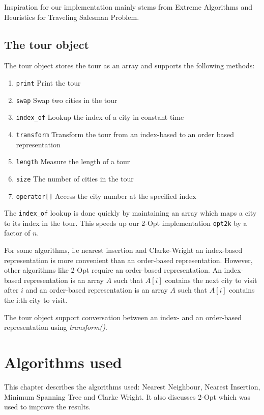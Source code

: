 \documentclass{report}
\begin{document}
Inspiration for our implementation mainly stems from Extreme Algorithms\cite{extreme} and Heuristics for Traveling Salesman Problem.\cite{Nilsson}

\section{The tour object}
The tour object stores the tour as an array and supports the following methods:
\begin{enumerate}
\item \verb!print! Print the tour
\item \verb!swap! Swap two cities in the tour
\item \verb!index_of! Lookup the index of a city in constant time
\item \verb!transform! Transform the tour from an index-based to an order based representation
\item \verb!length! Measure the length of a tour
\item \verb!size! The number of cities in the tour
\item \verb!operator[]! Access the city number at the specified index
\end{enumerate}

The \verb!index_of! lookup is done quickly by maintaining an array which maps a city to its index in the tour. This speeds up our 2-Opt implementation \verb!opt2k! by a factor of $n$.%

For some algorithms, i.e nearest insertion and Clarke-Wright an index-based representation is more convenient than an order-based representation. However, other algorithms like 2-Opt require an order-based representation. An index-based representation is an array $A$ such that $A[i]$ contains the next city to visit after $i$ and an order-based representation is an array $A$ such that $A[i]$ contains the i:th city to visit.

The tour object support conversation between an index- and an order-based representation using \textit{transform()}.

\chapter{Algorithms used}
This chapter describes the algorithms used: Nearest Neighbour, Nearest Insertion, Minimum Spanning Tree and Clarke Wright. It also discusses 2-Opt which was used to improve the results.
\end{document}
